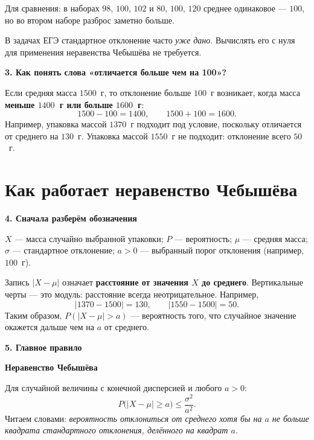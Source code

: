 \documentclass[a4paper,12pt]{article}
\newcommand{\lab}[1]{\par\noindent\textbf{#1}\par\vspace{-4pt}}
\begin{document}
Для сравнения: в наборах $98$, $100$, $102$ и $80$, $100$, $120$
среднее одинаковое --- $100$, но во втором наборе разброс заметно больше.

В задачах ЕГЭ стандартное отклонение часто \emph{уже дано}.
Вычислять его с нуля для применения неравенства Чебышёва не требуется.

\lab{3. Как понять слова «отличается больше чем на 100»?}
Если средняя масса $1500$~г, то отклонение больше $100$~г возникает,
когда масса \textbf{меньше $1400$~г или больше $1600$~г}:
\[
1500-100=1400,\qquad 1500+100=1600.
\]
Например, упаковка массой $1370$~г подходит под условие,
поскольку отличается от среднего на $130$~г. Упаковка массой
$1550$~г не подходит: отклонение всего $50$~г.

\begin{center}
\end{center}

\newpage
\section*{Как работает неравенство Чебышёва}
\lab{4. Сначала разберём обозначения}
$X$ --- масса случайно выбранной упаковки; $P$ --- вероятность;
$\mu$ --- средняя масса; $\sigma$ --- стандартное отклонение;
$a>0$ --- выбранный порог отклонения (например, $100$~г).

Запись $|X-\mu|$ означает \textbf{расстояние от значения $X$ до среднего}.
Вертикальные черты --- это модуль: расстояние всегда неотрицательное.
Например,
\[
|1370-1500|=130,\qquad |1550-1500|=50.
\]
Таким образом, $P(|X-\mu|>a)$ --- вероятность того, что
случайное значение окажется дальше чем на $a$ от среднего.

\lab{5. Главное правило}
\begin{center}
{\large\textcolor{deepaccent}{\bfseries Неравенство Чебышёва}}
\end{center}
Для случайной величины с конечной дисперсией и любого $a>0$:
\[
\boxed{\displaystyle
P\bigl(|X-\mu|\ge a\bigr)\le \frac{\sigma^2}{a^2}.}
\]
Читаем словами: \emph{вероятность отклониться от среднего хотя бы
на $a$ не больше квадрата стандартного отклонения, делённого
на квадрат $a$.}
\end{document}
